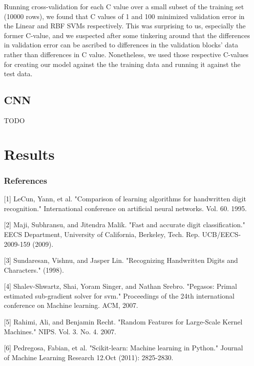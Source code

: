 ﻿\documentclass{article} %
\begin{document}
Running cross-validation for each C value over a small subset of
the training set (10000 rows), we found that C values of 1 and 100
minimized validation error in the Linear and RBF SVMs respectively.
This was surprising to us, especially the former C-value, and we
suspected after some tinkering around that the differences in
validation error can be ascribed to differences in the validation
blocks’ data rather than differences in C value. Nonetheless, we
used those respective C-values for creating our model against the
the training data and running it against the test data. 


\subsection{CNN}
TODO

\section{Results}

\subsubsection*{References}

\small{
  [1] LeCun, Yann, et al. "Comparison of learning algorithms for handwritten
  digit recognition." International conference on artificial neural networks.
  Vol. 60. 1995.	

  [2] Maji, Subhransu, and Jitendra Malik. "Fast and accurate digit
  classification." EECS Department, University of California,
  Berkeley, Tech. Rep. UCB/EECS-2009-159 (2009).

  [3] Sundaresan, Vishnu, and Jasper Lin. "Recognizing Handwritten Digits and
  Characters." (1998).

  [4] Shalev-Shwartz, Shai, Yoram Singer, and Nathan Srebro. "Pegasos: Primal
  estimated sub-gradient solver for svm." Proceedings of the 24th international
  conference on Machine learning. ACM, 2007.

  [5] Rahimi, Ali, and Benjamin Recht. "Random Features for Large-Scale Kernel
  Machines." NIPS. Vol. 3. No. 4. 2007.

  [6] Pedregosa, Fabian, et al. "Scikit-learn: Machine learning in Python."
  Journal of Machine Learning Research 12.Oct (2011): 2825-2830.
}
\end{document}
